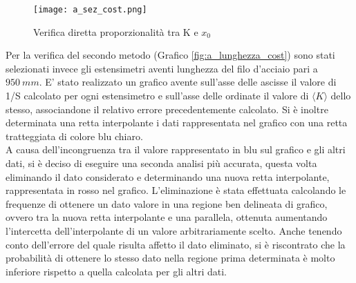 \documentclass[a4paper,11pt,oneside]{article}
\begin{document}
\begin{figure}[h!]
    \centering
        \label{fig:a_sezione_cost}
        \texttt{[image: a\_sez\_cost.png]}
        \caption{Verifica diretta proporzionalità tra K e $x_0$}
\end{figure}
Per la verifica del secondo metodo (Grafico \ref{fig:a_lunghezza_cost}) sono stati selezionati invece gli estensimetri aventi lunghezza del filo d'acciaio pari a $\SI{950}{mm}$. E' stato realizzato un grafico avente sull'asse delle ascisse il valore di 1/S  calcolato per ogni estensimetro e sull'asse delle ordinate il valore di $\langle K \rangle$ dello stesso, associandone il relativo errore precedentemente calcolato. Si è inoltre determinata una retta interpolante i dati rappresentata nel grafico con una retta tratteggiata di colore blu chiaro.\\
A causa dell'incongruenza tra il valore rappresentato in blu sul grafico e gli altri dati, si è deciso di eseguire una seconda analisi più accurata, questa volta eliminando il dato considerato e determinando una nuova retta interpolante, rappresentata in rosso nel grafico. L'eliminazione è stata effettuata calcolando le frequenze di ottenere un dato valore in una regione ben delineata di grafico, ovvero tra la nuova retta interpolante e una parallela, ottenuta aumentando l'intercetta dell'interpolante di un valore arbitrariamente scelto. Anche tenendo conto dell'errore del quale risulta affetto il dato eliminato, si è riscontrato che la probabilità di ottenere lo stesso dato nella regione prima determinata è molto inferiore rispetto a quella calcolata per gli altri dati.
\end{document}
